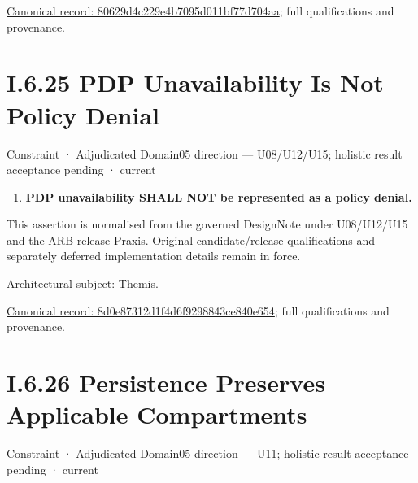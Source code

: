 {\footnotesize \href{../../../../continuum/motivation/constraint/80629d4c229e4b7095d011bf77d704aa.md}{Canonical record: 80629d4c229e4b7095d011bf77d704aa}; full qualifications and provenance.}\par
\section*{I.6.25 PDP Unavailability Is Not Policy Denial}
\label{navigation:I.6.25}

\label{element:8d0e87312d1f4d6f9298843ce840e654}
{\small Constraint · Adjudicated Domain05 direction — U08/U12/U15; holistic result acceptance pending · current}\par

\begin{enumerate}


\item \textbf{PDP unavailability SHALL NOT be represented as a policy denial.}

\end{enumerate}


This assertion is normalised from the governed DesignNote under U08/U12/U15 and the ARB release Praxis. Original candidate/release qualifications and separately deferred implementation details remain in force.



Architectural subject: \hyperref[element:899d34ec491948b68aad09e507dea6d1]{Themis}.


{\footnotesize \href{../../../../continuum/motivation/constraint/8d0e87312d1f4d6f9298843ce840e654.md}{Canonical record: 8d0e87312d1f4d6f9298843ce840e654}; full qualifications and provenance.}\par
\section*{I.6.26 Persistence Preserves Applicable Compartments}
\label{navigation:I.6.26}

\label{element:6e963678cf6f4c3488c798d6afc3b910}
{\small Constraint · Adjudicated Domain05 direction — U11; holistic result acceptance pending · current}\par

